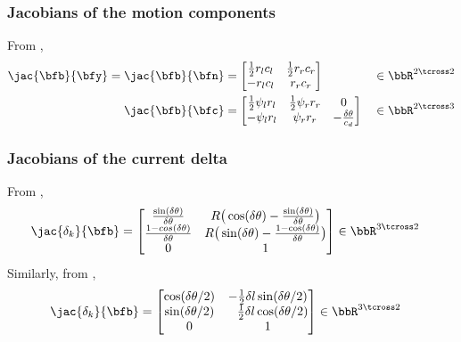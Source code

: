 \subsubsection{Jacobians of the motion components}
%
From ,
%
\begin{subequations}
\label{equ:diff_drive_psis_jac}
\begin{align}
\jac{\bfb}{\bfy} = \jac{\bfb}{\bfn} &= \begin{bmatrix}
\frac12 r_l c_l & \frac12 r_r c_r  \\
- r_l c_l       & r_r c_r
\end{bmatrix}
&&\in \bbR^{2\tcross2}
\\
\jac{\bfb}{\bfc} &= \begin{bmatrix}
\frac12 \psi_{l} r_l & \frac12 \psi_{r} r_r & 0\\
-\psi_{l} r_l        & \psi_{r} r_r & -\frac{\delta\theta}{c_d}
\end{bmatrix}
&&\in \bbR^{2\tcross3}
\end{align}
\end{subequations}



\subsubsection{Jacobians of the current delta}

From ,
%
\begin{align}\label{equ:diff_drive_exact_inte_jac}
\jac{\delta_k}{\bfb} &= 
\begin{bmatrix}
\frac{\sin(\delta\theta)}{\delta\theta} 
&
R\big(\cos(\delta\theta)-\frac{\sin(\delta\theta)}{\delta\theta}\big)\\
\frac{1-cos(\delta\theta)}{\delta\theta} 
&
R\big(\sin(\delta\theta)-\frac{1-\cos(\delta\theta)}{\delta\theta}\big)\\
0 & 1
\end{bmatrix}
\in \bbR^{3\tcross2}
\end{align}
%
Similarly, from ,
%
\begin{align}\label{equ:diff_drive_runge_kutta_meas_jac}
\jac{\delta_k}{\bfb} &=
\begin{bmatrix}
\cos(\delta\theta/2) &-\frac12\delta l\sin(\delta\theta/2)\\
\sin(\delta\theta/2) &\phantom{-}\frac12\delta l\cos(\delta\theta/2)\\
0 & 1
\end{bmatrix}
\in \bbR^{3\tcross2}
\end{align}
%
